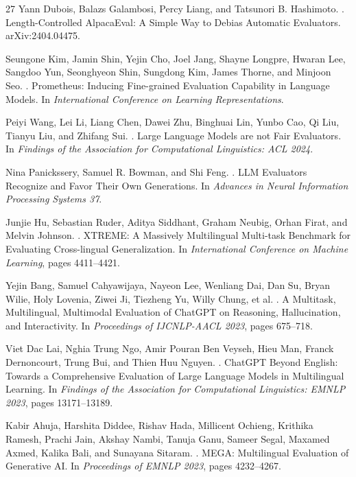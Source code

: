 \documentclass[10pt,twocolumn]{article}
\begin{document}
\begin{thebibliography}{27}
Yann Dubois, Balazs Galambosi, Percy Liang, and Tatsunori B. Hashimoto.
.
\newblock Length-Controlled AlpacaEval: A Simple Way to Debias Automatic Evaluators.
\newblock arXiv:2404.04475.

Seungone Kim, Jamin Shin, Yejin Cho, Joel Jang, Shayne Longpre, Hwaran Lee, Sangdoo Yun, Seonghyeon Shin, Sungdong Kim, James Thorne, and Minjoon Seo.
.
\newblock Prometheus: Inducing Fine-grained Evaluation Capability in Language Models.
\newblock In \emph{International Conference on Learning Representations}.

Peiyi Wang, Lei Li, Liang Chen, Dawei Zhu, Binghuai Lin, Yunbo Cao, Qi Liu, Tianyu Liu, and Zhifang Sui.
.
\newblock Large Language Models are not Fair Evaluators.
\newblock In \emph{Findings of the Association for Computational Linguistics: ACL 2024}.

Nina Panickssery, Samuel R. Bowman, and Shi Feng.
.
\newblock LLM Evaluators Recognize and Favor Their Own Generations.
\newblock In \emph{Advances in Neural Information Processing Systems 37}.

Junjie Hu, Sebastian Ruder, Aditya Siddhant, Graham Neubig, Orhan Firat, and Melvin Johnson.
.
\newblock XTREME: A Massively Multilingual Multi-task Benchmark for Evaluating Cross-lingual Generalization.
\newblock In \emph{International Conference on Machine Learning}, pages 4411--4421.

Yejin Bang, Samuel Cahyawijaya, Nayeon Lee, Wenliang Dai, Dan Su, Bryan Wilie, Holy Lovenia, Ziwei Ji, Tiezheng Yu, Willy Chung, et al.
.
\newblock A Multitask, Multilingual, Multimodal Evaluation of ChatGPT on Reasoning, Hallucination, and Interactivity.
\newblock In \emph{Proceedings of IJCNLP-AACL 2023}, pages 675--718.

Viet Dac Lai, Nghia Trung Ngo, Amir Pouran Ben Veyseh, Hieu Man, Franck Dernoncourt, Trung Bui, and Thien Huu Nguyen.
.
\newblock ChatGPT Beyond English: Towards a Comprehensive Evaluation of Large Language Models in Multilingual Learning.
\newblock In \emph{Findings of the Association for Computational Linguistics: EMNLP 2023}, pages 13171--13189.

Kabir Ahuja, Harshita Diddee, Rishav Hada, Millicent Ochieng, Krithika Ramesh, Prachi Jain, Akshay Nambi, Tanuja Ganu, Sameer Segal, Maxamed Axmed, Kalika Bali, and Sunayana Sitaram.
.
\newblock MEGA: Multilingual Evaluation of Generative AI.
\newblock In \emph{Proceedings of EMNLP 2023}, pages 4232--4267.


\end{thebibliography}
\end{document}
